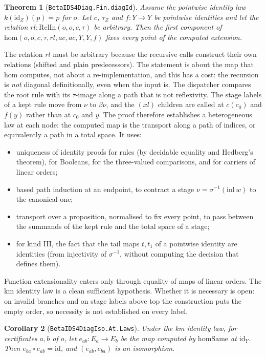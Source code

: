 \documentclass[11pt]{article}
\newtheorem{theorem}{Theorem}[section]
\newtheorem{corollary}[theorem]{Corollary}
\theoremstyle{remark}
\newcommand{\id}{\mathrm{id}}
\renewcommand{\tt}[1]{\texttt{#1}}
\begin{document}
\begin{theorem}[\tt{BetaIDS4Diag.Fin.diagId}]\label{thm:diag}
Assume the pointwise identity law $k(\id_Z)(p)=p$ for $o$. Let $c$,
$\tau_Z$ and $f:Y\to Y$ be pointwise identities and let the relation
$rl:\mathrm{RelIn}(o,o,c,\tau)$ be arbitrary. Then the first component of
$\mathrm{hom}(o,o,c,\tau,rl,ac,ac,Y,Y,f)$ fixes every point of the
computed extension.
\end{theorem}

The relation $rl$ must be arbitrary because the recursive calls construct
their own relations (shifted and plain predecessors). The statement is
about the map that $\mathrm{hom}$ computes, not about a
re-implementation, and this has a cost: the recursion is \emph{not}
diagonal definitionally, even when the input is. The dispatcher compares
the root rule with its $\tau$-image along a path that is not reflexivity.
The stage labels of a kept rule move from $\nu$ to $\beta\nu$, and the
$(xl)$ children are called at $c(c_0)$ and $f(y)$ rather than at $c_0$ and
$y$. The proof therefore establishes a heterogeneous law at each node: the
computed map is the transport along a path of indices, or equivalently a
path in a total space. It uses:
\begin{itemize}
\item uniqueness of identity proofs for rules (by decidable equality and
Hedberg's theorem), for Booleans, for the three-valued comparisons, and
for carriers of linear orders;
\item based path induction at an endpoint, to contract a stage
$\nu=\sigma^{-1}(\mathrm{inl}\,w)$ to the canonical one;
\item transport over a proposition, normalised to fix every point, to pass
between the summands of the kept rule and the total space of a stage;
\item for kind III, the fact that the tail maps $t,t_1$ of a pointwise
identity are identities (from injectivity of $\sigma^{-1}$, without
computing the decision that defines them).
\end{itemize}
Function extensionality enters only through equality of maps of linear
orders. The km identity law is a clean sufficient hypothesis. Whether it
is necessary is open: on invalid branches and on stage labels above top
the construction puts the empty order, so necessity is not established on
every label.

\begin{corollary}[\tt{BetaIDS4DiagIso.At.Laws}]
Under the km identity law, for certificates $a,b$ of $o$, let
$e_{ab}:E_a\to E_b$ be the map computed by $\mathrm{homSame}$ at $\id_Y$.
Then $e_{ba}\circ e_{ab}=\id$, and $(e_{ab},e_{ba})$ is an isomorphism.
\end{corollary}
\end{document}
